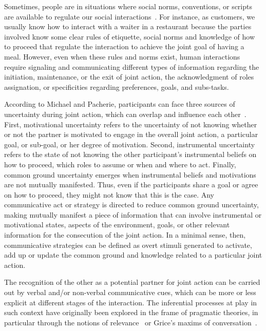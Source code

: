 \documentclass[a4paper,11pt,twoside]{StyleThese}
\begin{document}
Sometimes, people are in situations where social norms, conventions, or scripts are available to regulate our social interactions~\cite{schank_1977_scripts,andrews_2012_apes, castro_2020_social}. For instance, as customers, we usually know how to interact with a waiter in a restaurant because the parties involved know some clear rules of etiquette, social norms and knowledge of how to proceed that regulate the interaction to achieve the joint goal of having a meal. However, even when these rules and norms exist, human interactions require signaling and communicating different types of information regarding the initiation, maintenance, or the exit of joint action, the acknowledgment of roles assignation, or specificities regarding preferences, goals, and subs-tasks. 

According to Michael and Pacherie, participants can face three sources of uncertainty during joint action, which can overlap and influence each other~\cite{michael_2015_commitments}. First, motivational uncertainty refers to the uncertainty of not knowing whether or not the partner is motivated to engage in the overall joint action, a particular goal, or sub-goal, or her degree of motivation. Second, instrumental uncertainty refers to the state of not knowing the other participant’s instrumental beliefs on how to proceed, \ie which roles to assume or when and where to act. Finally, common ground uncertainty emerges when instrumental beliefs and motivations are not mutually manifested. Thus, even if the participants share a goal or agree on how to proceed, they might not know that this is the case. Any communicative act or strategy is directed to reduce common ground uncertainty, making mutually manifest a piece of information that can involve instrumental or motivational states, aspects of the environment, goals, or other relevant information for the consecution of the joint action. In a minimal sense, then, communicative strategies can be defined as overt stimuli generated to activate, add up or update the common ground and knowledge related to a particular joint action. 

The recognition of the other as a potential partner for joint action can be carried out by verbal and/or non-verbal communicative cues, which can be more or less explicit at different stages of the interaction. The inferential processes at play in such context have originally been explored in the frame of pragmatic theories, in particular through the notions of relevance~\cite{sperber_1995_relevance} or Grice’s maxims of conversation~\cite{grice_1989_studies}.
\end{document}
